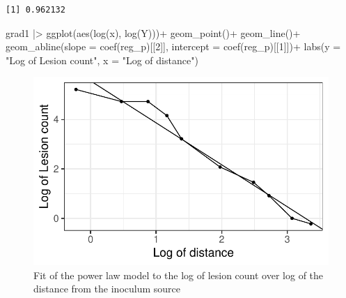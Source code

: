 \documentclass[
  letterpaper,
  DIV=11,
  numbers=noendperiod]{scrreprt}
\newenvironment{Shaded}{\begin{snugshade}}{\end{snugshade}}
\newcommand{\AttributeTok}[1]{\textcolor[rgb]{0.40,0.45,0.13}{#1}}
\newcommand{\DecValTok}[1]{\textcolor[rgb]{0.68,0.00,0.00}{#1}}
\newcommand{\FunctionTok}[1]{\textcolor[rgb]{0.28,0.35,0.67}{#1}}
\newcommand{\NormalTok}[1]{\textcolor[rgb]{0.00,0.23,0.31}{#1}}
\newcommand{\OtherTok}[1]{\textcolor[rgb]{0.00,0.23,0.31}{#1}}
\newcommand{\SpecialCharTok}[1]{\textcolor[rgb]{0.37,0.37,0.37}{#1}}
\newcommand{\StringTok}[1]{\textcolor[rgb]{0.13,0.47,0.30}{#1}}
\begin{document}
\begin{Shaded}
\end{Shaded}

\begin{verbatim}
[1] 0.962132
\end{verbatim}

\begin{Shaded}
\begin{Highlighting}[]
\NormalTok{grad1 }\SpecialCharTok{|\textgreater{}} 
  \FunctionTok{ggplot}\NormalTok{(}\FunctionTok{aes}\NormalTok{(}\FunctionTok{log}\NormalTok{(x), }\FunctionTok{log}\NormalTok{(Y)))}\SpecialCharTok{+}
  \FunctionTok{geom\_point}\NormalTok{()}\SpecialCharTok{+}
  \FunctionTok{geom\_line}\NormalTok{()}\SpecialCharTok{+}
  \FunctionTok{geom\_abline}\NormalTok{(}\AttributeTok{slope =} \FunctionTok{coef}\NormalTok{(reg\_p)[[}\DecValTok{2}\NormalTok{]], }\AttributeTok{intercept =} \FunctionTok{coef}\NormalTok{(reg\_p)[[}\DecValTok{1}\NormalTok{]])}\SpecialCharTok{+}
 \FunctionTok{labs}\NormalTok{(}\AttributeTok{y =} \StringTok{"Log of Lesion count"}\NormalTok{,}
       \AttributeTok{x =} \StringTok{"Log of distance"}\NormalTok{)}
\end{Highlighting}
\end{Shaded}

\begin{figure}[H]

{\centering \includegraphics{spatial-fitting_files/figure-pdf/fig-fit_grad3-1.pdf}

}

\caption{\label{fig-fit_grad3}Fit of the power law model to the log of
lesion count over log of the distance from the inoculum source}

\end{figure}
\end{document}
